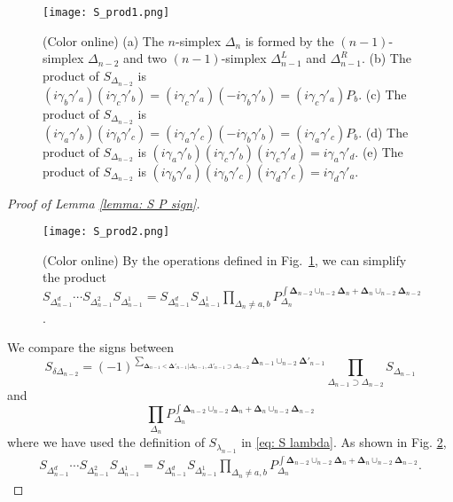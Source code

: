 \documentclass[12pt]{article}
\newcommand{\g}{\gamma}
\begin{document}
\begin{figure}[htb]
\centering
\texttt{[image: S\_prod1.png]}
\caption{(Color online) (a) The $n$-simplex $\Delta_n$ is formed by the $(n-1)$-simplex $\Delta_{n-2}$ and two $(n-1)$-simplex $\Delta^L_{n-1}$ and $\Delta^R_{n-1}$. (b) The product of $S_{\Delta_{n-2}}$ is $(i \g_b \g'_a) (i \g_c \g'_b) = (i \g_c \g'_a) (-i\g_b \g'_b)=(i \g_c \g'_a) P_b $. (c) The product of $S_{\Delta_{n-2}}$ is $(i \g_a \g'_b) (i \g_b \g'_c) = (i \g_a \g'_c) (-i\g_b \g'_b)=(i \g_a \g'_c) P_b $. (d) The product of $S_{\Delta_{n-2}}$ is $(i \g_a \g'_b) (i \g_c \g'_b) (i \g_c \g'_d) = i \g_a \g'_d$. (e) The product of $S_{\Delta_{n-2}}$ is $(i \g_b \g'_a) (i \g_b \g'_c) (i \g_d \g'_c) = i \g_d \g'_a$.} 
\label{fig: S_prod1}
\end{figure}


\begin{proof}[Proof of Lemma \ref{lemma: S P sign}]
\begin{figure}[htb]
\centering
\texttt{[image: S\_prod2.png]}
\caption{(Color online) By the operations defined in Fig.~\ref{fig: S_prod1}, we can simplify the product $S_{\Delta^d_{n-1}} \cdots S_{\Delta^2_{n-1}} S_{\Delta^1_{n-1}} = S_{\Delta^d_{n-1}} S_{\Delta^1_{n-1}} \prod_{{\Delta_{n}}\neq a,b} P_{\Delta_{n}}^{\int \boldsymbol \Delta_{n-2} \cup_{n-2} \boldsymbol \Delta_{n} + \boldsymbol \Delta_{n} \cup_{n-2} \boldsymbol \Delta_{n-2}}$. }
\label{fig: S_prod2}
\end{figure}
We compare the signs between
\begin{equation}
    S_{\delta {\Delta_{n-2}}} = (-1)^{\sum_{\boldsymbol \Delta_{n-1} < \boldsymbol \Delta'_{n-1} | \Delta_{n-1}, \Delta'_{n-1} \supset \Delta_{n-2} } \boldsymbol \Delta_{n-1} \cup_{n-2} \boldsymbol \Delta'_{n-1} } \prod_{\Delta_{n-1} \supset \Delta_{n-2}} S_{\Delta_{n-1}}
\label{eq: prod of S}
\end{equation}
and
\begin{equation}
    \prod_{{\Delta_{n}}} P_{\Delta_{n}}^{\int \boldsymbol \Delta_{n-2} \cup_{n-2} \boldsymbol \Delta_{n} + \boldsymbol \Delta_{n} \cup_{n-2} \boldsymbol \Delta_{n-2}}
\end{equation}
where we have used the definition of $S_{ \lambda_{n-1}}$ in \eqref{eq: S lambda}.
As shown in Fig. \ref{fig: S_prod2},
\begin{equation}
    \begin{split}
        S_{\Delta^d_{n-1}} \cdots S_{\Delta^2_{n-1}} S_{\Delta^1_{n-1}} = S_{\Delta^d_{n-1}} S_{\Delta^1_{n-1}} \prod_{{\Delta_{n}}\neq a,b} P_{\Delta_{n}}^{\int \boldsymbol \Delta_{n-2} \cup_{n-2} \boldsymbol \Delta_{n} + \boldsymbol \Delta_{n} \cup_{n-2} \boldsymbol \Delta_{n-2}}.

\end{split}
\end{equation}
\end{proof}
\end{document}
